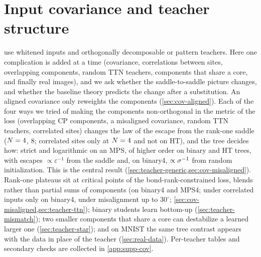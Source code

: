 \section{Input covariance and teacher structure}\label{sec:covariance-teacher}

 use whitened inputs and orthogonally decomposable or pattern teachers.
Here one complication is added at a time (covariance, correlations between sites, overlapping
components, random TTN teachers, components that share a core, and finally real images), and we ask
whether the saddle-to-saddle picture changes, and whether the baseline theory predicts the change after
a substitution. An aligned covariance only reweights the components (\cref{sec:cov-aligned}). Each of
the four ways we tried of making the components non-orthogonal in the metric of the loss (overlapping CP
components, a misaligned covariance, random TTN teachers, correlated sites) changes the law of the escape
from the rank-one saddle ($N=4$, $8$; correlated sites only at $N=4$ and not on HT), and the tree decides
how: strict and logarithmic on an MPS, of higher order on binary and HT trees, with escapes
$\propto\varepsilon^{-1}$ from the saddle and, on binary4, $\propto\sigma^{-1}$ from random initialization. This is the central result
(\cref{sec:teacher-generic,sec:cov-misaligned}). Rank-one plateaus sit at critical points of the
bond-rank-constrained loss, blends rather than partial sums of components (on binary4 and MPS4; under
correlated inputs only on binary4, under misalignment up to $30^\circ$; \cref{sec:cov-misaligned,sec:teacher-ttn});
binary students learn bottom-up
(\cref{sec:teacher-mismatch}); two
smaller components that share a core can destabilize a learned larger one (\cref{sec:teacher-star}); and on
MNIST the same tree contrast appears with the data in place of the teacher (\cref{sec:real-data}).
Per-teacher tables and secondary checks are collected in \cref{app:supp-cov}.


